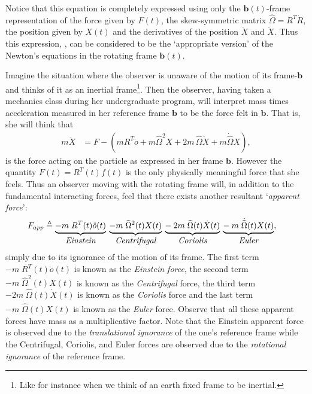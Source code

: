 \documentclass[graybox,envcountchap,sectrefs]{svmonoMuga}
\begin{document}
Notice that this equation is completely  expressed using only the $\mathbf{b}(t)$-frame representation of the force given by $F(t)$, the skew-symmetric matrix $\widehat{\Omega}=R^T\dot{R}$,  the position given by $X(t)$ and the derivatives of the position $\dot{X}$ and $\ddot{X}$. Thus this expression, , can be considered to be the `appropriate version' of the Newton's equations in the rotating frame $\mathbf{b}(t)$.

Imagine the situation where the observer is unaware of the motion of its frame-$\mathbf{b}$ and thinks of it as an inertial frame\footnote{Like for instance when we think of an earth fixed frame to be inertial.}. Then the observer, having taken a mechanics class during her undergraduate program, will interpret mass times acceleration measured in her reference frame $\mathbf{b}$ to be the force felt in $\mathbf{b}$. That is, she will think that
\begin{align}
m\ddot{X}&=F-\left(mR^T\ddot{o}+m\widehat{\Omega}^2 X+2m\,\widehat{\Omega}\dot{X}+m\dot{\widehat{\Omega}}X\right),
\end{align}
is the force acting on the particle as expressed in her frame $\mathbf{b}$.
However the quantity $F(t)=R^T(t)f(t)$ is the only physically meaningful force that she feels.
Thus an observer moving with the rotating frame will, in addition to the fundamental interacting forces, feel that there exists another resultant `\textit{apparent force}':
\begin{align}
F_{app} &\triangleq  
\underbrace{-m\;R^T(t)\ddot{o}(t)}_{\mbox{\it Einstein}}\:\underbrace{-m\;\widehat{\Omega}^2(t) X(t)}_{\mbox{\it Centrifugal}}\:\underbrace{-\:2m\;\widehat{\Omega}(t)\dot{X}(t)}_{\mbox{\it Coriolis}}\:\underbrace{- \:m\;\dot{\widehat{\Omega}}(t) X(t)}_{\mbox{\it Euler}},\label{eq:AppearentForcesMoving}
\end{align}
simply due to its ignorance of the motion of its frame.
The first term $-m\;R^T(t)\ddot{o}(t)$ is known as the \textit{Einstein force}, the second term $-m\;\widehat{\Omega}^2(t) X(t)$ is known as the \textit{Centrifugal} force, the third term $-2m\;\widehat{\Omega}(t)\dot{X}(t)$ is known as the \textit{Coriolis} force and the last term 
$- m\;\dot{\widehat{\Omega}}(t) X(t)$ is known as the \textit{Euler} force. Observe that all these apparent forces have mass as a multiplicative factor. 
Note that the Einstein apparent force is observed due to the \textit{translational ignorance} of the one's reference frame while the Centrifugal, Coriolis, and Euler forces are observed due to the \textit{rotational ignorance} of the reference frame.
\end{document}

